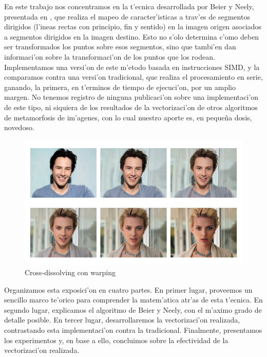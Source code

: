 En este trabajo nos concentramos en la t'ecnica desarrollada por Beier y Neely, presentada en \cite{1}, que realiza el mapeo de caracter'isticas a trav'es de segmentos dirigidos (l'ineas rectas con principio, fin y sentido) en la imagen origen asociados a segmentos dirigidos en la imagen destino. Esto no s'olo determina c'omo deben ser transformados los puntos sobre esos segmentos, sino que tambi'en dan informaci'on sobre la transformaci'on de los puntos que los rodean. Implementamos una versi'on de este m'etodo basada en instrucciones SIMD, y la comparamos contra una versi'on tradicional, que realiza el procesamiento en serie, ganando, la primera, en t'erminos de tiempo de ejecuci'on, por un amplio margen. No tenemos registro de ninguna publicaci'on sobre una implementaci'on de este tipo, ni siquiera de los resultados de la vectorizaci'on de otros algoritmos de metamorfosis de im'agenes, con lo cual nuestro aporte es, en peque\~{n}a dosis, novedoso.

\begin{figure}[H]
	\begin{center}
		\includegraphics[scale=0.65]{imagenes/warping.png}
	\end{center}		
	\caption{Cross-dissolving con warping}
	\label{fig2}
\end{figure}

Organizamos esta exposici'on en cuatro partes. En primer lugar, proveemos un sencillo marco te'orico para comprender la matem'atica atr'as de esta t'ecnica. En segundo lugar, explicamos el algoritmo de Beier y Neely, con el m'aximo grado de detalle posible. En tercer lugar, desarrollaremos la vectorizaci'on realizada, contrastando esta implementaci'on contra la tradicional. Finalmente, presentamos los experimentos y, en base a ello, concluimos sobre la efectividad de la vectorizaci'on realizada.